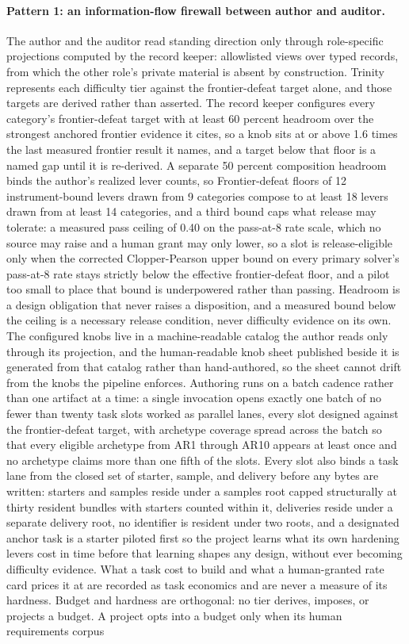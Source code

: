 \documentclass[11pt]{article}
\begin{document}
\paragraph{Pattern 1: an information-flow firewall between author and auditor.}
The author and the auditor read standing direction only through role-specific projections computed by the record keeper: allowlisted views over typed records, from which the other role's private material is absent by construction. Trinity represents each difficulty tier against the frontier-defeat target alone, and those targets are derived rather than asserted. The record keeper configures every category's frontier-defeat target with at least 60 percent headroom over the strongest anchored frontier evidence it cites, so a knob sits at or above 1.6 times the last measured frontier result it names, and a target below that floor is a named gap until it is re-derived. A separate 50 percent composition headroom binds the author's realized lever counts, so Frontier-defeat floors of 12 instrument-bound levers drawn from 9 categories compose to at least 18 levers drawn from at least 14 categories, and a third bound caps what release may tolerate: a measured pass ceiling of 0.40 on the pass-at-8 rate scale, which no source may raise and a human grant may only lower, so a slot is release-eligible only when the corrected Clopper-Pearson upper bound on every primary solver's pass-at-8 rate stays strictly below the effective frontier-defeat floor, and a pilot too small to place that bound is underpowered rather than passing. Headroom is a design obligation that never raises a disposition, and a measured bound below the ceiling is a necessary release condition, never difficulty evidence on its own. The configured knobs live in a machine-readable catalog the author reads only through its projection, and the human-readable knob sheet published beside it is generated from that catalog rather than hand-authored, so the sheet cannot drift from the knobs the pipeline enforces. Authoring runs on a batch cadence rather than one artifact at a time: a single invocation opens exactly one batch of no fewer than twenty task slots worked as parallel lanes, every slot designed against the frontier-defeat target, with archetype coverage spread across the batch so that every eligible archetype from AR1 through AR10 appears at least once and no archetype claims more than one fifth of the slots. Every slot also binds a task lane from the closed set of starter, sample, and delivery before any bytes are written: starters and samples reside under a samples root capped structurally at thirty resident bundles with starters counted within it, deliveries reside under a separate delivery root, no identifier is resident under two roots, and a designated anchor task is a starter piloted first so the project learns what its own hardening levers cost in time before that learning shapes any design, without ever becoming difficulty evidence. What a task cost to build and what a human-granted rate card prices it at are recorded as task economics and are never a measure of its hardness. Budget and hardness are orthogonal: no tier derives, imposes, or projects a budget. A project opts into a budget only when its human requirements corpus 
\end{document}
